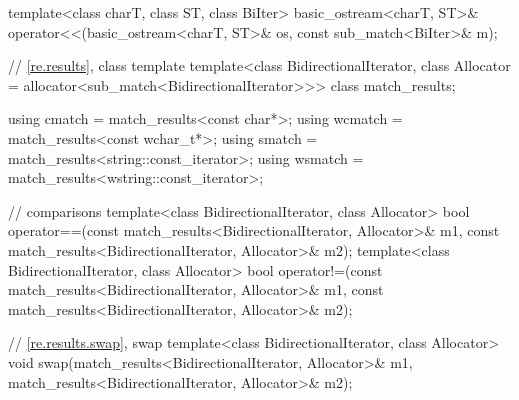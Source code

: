 \begin{codeblock}
{  template<class charT, class ST, class BiIter>
    basic_ostream<charT, ST>&
      operator<<(basic_ostream<charT, ST>& os, const sub_match<BiIter>& m);

  // \ref{re.results}, class template 
  template<class BidirectionalIterator,
           class Allocator = allocator<sub_match<BidirectionalIterator>>>
    class match_results;

  using cmatch  = match_results<const char*>;
  using wcmatch = match_results<const wchar_t*>;
  using smatch  = match_results<string::const_iterator>;
  using wsmatch = match_results<wstring::const_iterator>;

  //  comparisons
  template<class BidirectionalIterator, class Allocator>
    bool operator==(const match_results<BidirectionalIterator, Allocator>& m1,
                    const match_results<BidirectionalIterator, Allocator>& m2);
  template<class BidirectionalIterator, class Allocator>
    bool operator!=(const match_results<BidirectionalIterator, Allocator>& m1,
                    const match_results<BidirectionalIterator, Allocator>& m2);

  // \ref{re.results.swap},  swap
  template<class BidirectionalIterator, class Allocator>
    void swap(match_results<BidirectionalIterator, Allocator>& m1,
              match_results<BidirectionalIterator, Allocator>& m2);

}
\end{codeblock}
